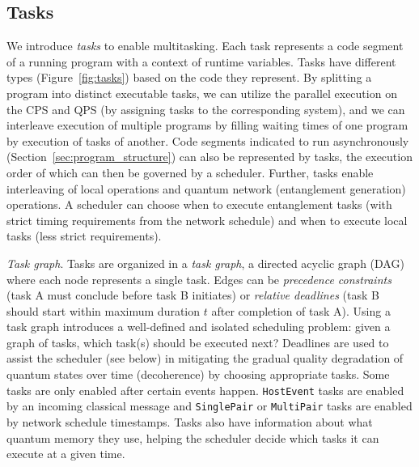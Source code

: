 \subsection{Tasks}
\label{sec:tasks}
We introduce \textit{tasks} to enable multitasking.
Each task represents a code segment of a running program with a context of runtime variables.
Tasks have different types (Figure~\ref{fig:tasks}) based on the code they represent.
By splitting a program into distinct executable tasks, 
we can utilize the parallel execution on the CPS and QPS (by assigning tasks to the corresponding system),
and we can interleave execution of multiple programs by filling waiting times of one program by execution of tasks of another.
Code segments indicated to run asynchronously (Section~\ref{sec:program_structure}) can also be represented by tasks, the execution order of which can then be governed by a scheduler.
Further, tasks enable interleaving of local operations and quantum network (entanglement generation) operations.
A scheduler can choose when to execute entanglement tasks (with strict timing requirements from the network schedule)
and when to execute local tasks (less strict requirements).

\textit{Task graph}.
Tasks are organized in a \textit{task graph}, a directed acyclic graph (DAG) where each node represents a single task.
Edges can be \textit{precedence constraints} (task A must conclude before task B initiates) or \textit{relative deadlines} (task B should start within maximum duration $t$ after completion of task A).
Using a task graph introduces a well-defined and isolated scheduling problem: given a graph of tasks, which task(s) should be executed next?
Deadlines are used to assist the scheduler (see below) in mitigating the gradual quality degradation of quantum states over time (decoherence) by choosing appropriate tasks.
Some tasks are only enabled after certain events happen.
\texttt{HostEvent} tasks are enabled by an incoming classical message and \texttt{SinglePair} or \texttt{MultiPair} tasks are enabled by network schedule timestamps.
Tasks also have information about what quantum memory they use, helping the scheduler decide which tasks it can execute at a given time.

